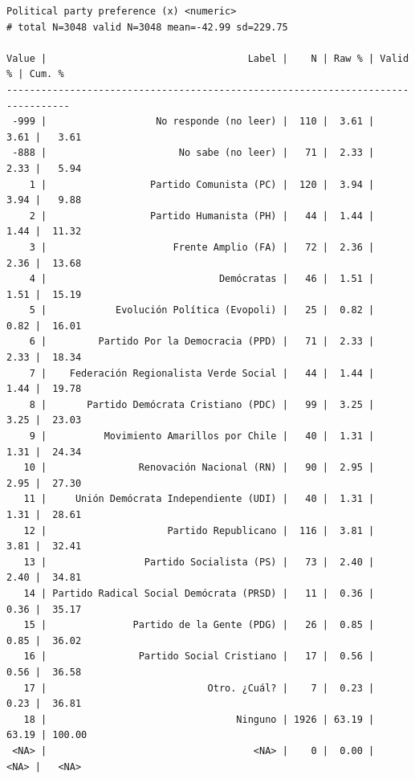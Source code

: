 \documentclass[
  letterpaper,
  DIV=11,
  numbers=noendperiod]{scrreprt}
\begin{document}
\begin{verbatim}
Political party preference (x) <numeric> 
# total N=3048 valid N=3048 mean=-42.99 sd=229.75

Value |                                   Label |    N | Raw % | Valid % | Cum. %
---------------------------------------------------------------------------------
 -999 |                   No responde (no leer) |  110 |  3.61 |    3.61 |   3.61
 -888 |                       No sabe (no leer) |   71 |  2.33 |    2.33 |   5.94
    1 |                  Partido Comunista (PC) |  120 |  3.94 |    3.94 |   9.88
    2 |                  Partido Humanista (PH) |   44 |  1.44 |    1.44 |  11.32
    3 |                      Frente Amplio (FA) |   72 |  2.36 |    2.36 |  13.68
    4 |                              Demócratas |   46 |  1.51 |    1.51 |  15.19
    5 |            Evolución Política (Evopoli) |   25 |  0.82 |    0.82 |  16.01
    6 |         Partido Por la Democracia (PPD) |   71 |  2.33 |    2.33 |  18.34
    7 |    Federación Regionalista Verde Social |   44 |  1.44 |    1.44 |  19.78
    8 |       Partido Demócrata Cristiano (PDC) |   99 |  3.25 |    3.25 |  23.03
    9 |          Movimiento Amarillos por Chile |   40 |  1.31 |    1.31 |  24.34
   10 |                Renovación Nacional (RN) |   90 |  2.95 |    2.95 |  27.30
   11 |     Unión Demócrata Independiente (UDI) |   40 |  1.31 |    1.31 |  28.61
   12 |                     Partido Republicano |  116 |  3.81 |    3.81 |  32.41
   13 |                 Partido Socialista (PS) |   73 |  2.40 |    2.40 |  34.81
   14 | Partido Radical Social Demócrata (PRSD) |   11 |  0.36 |    0.36 |  35.17
   15 |               Partido de la Gente (PDG) |   26 |  0.85 |    0.85 |  36.02
   16 |                Partido Social Cristiano |   17 |  0.56 |    0.56 |  36.58
   17 |                            Otro. ¿Cuál? |    7 |  0.23 |    0.23 |  36.81
   18 |                                 Ninguno | 1926 | 63.19 |   63.19 | 100.00
 <NA> |                                    <NA> |    0 |  0.00 |    <NA> |   <NA>
\end{verbatim}
\end{document}
